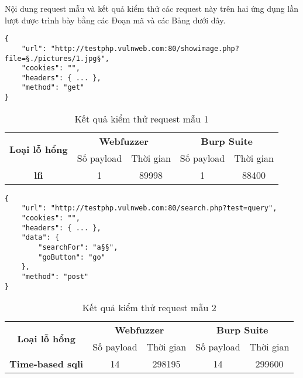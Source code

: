 \FloatBarrier
Nội dung request mẫu và kết quả kiểm thử các request này trên hai ứng dụng lần lượt được trình bày bằng các Đoạn mã và các Bảng dưới đây.
\begin{lstlisting}[style=ES6, label={lst:base-request-1}, caption={Request mẫu 1 có lỗ hổng \acrshort{lfi}}]
{
    "url": "http://testphp.vulnweb.com:80/showimage.php?file=§./pictures/1.jpg§",
    "cookies": "",
    "headers": { ... },
    "method": "get"
}
\end{lstlisting}
\FloatBarrier
\begin{table}[ht]
    \centering
    \caption{Kết quả kiểm thử request mẫu 1}
    \label{tab:testing-result-1}
    \begin{tabular}[ht]{ccccc}
        \toprule[1pt]\midrule[0.3pt]
            \multirow{2}{*}{\textbf{Loại lỗ hổng}}&\multicolumn{2}{c}{\textbf{Webfuzzer}}&\multicolumn{2}{c}{\textbf{Burp Suite}}\\
            \cmidrule(lr){2-3}\cmidrule(lr){4-5}{}&Số payload&Thời gian&Số payload&Thời gian\\
        \midrule[0.3pt]
            \textbf{\acrshort{lfi}}&1&89998&1&88400\\
        \midrule[0.3pt]\bottomrule[1pt]
    \end{tabular}
\end{table}
\FloatBarrier
\begin{lstlisting}[style=ES6, label={lst:base-request-2}, caption={Request mẫu 2 có lỗ hổng time-based \acrshort{sqli}}]
{
    "url": "http://testphp.vulnweb.com:80/search.php?test=query",
    "cookies": "",
    "headers": { ... },
    "data": {
        "searchFor": "a§§",
        "goButton": "go"
    },
    "method": "post"
}
\end{lstlisting}
\FloatBarrier
\begin{table}[ht]
    \centering
    \caption{Kết quả kiểm thử request mẫu 2}
    \label{tab:testing-result-2}
    \begin{tabular}[ht]{ccccc}
        \toprule[1pt]\midrule[0.3pt]
            \multirow{2}{*}{\textbf{Loại lỗ hổng}}&\multicolumn{2}{c}{\textbf{Webfuzzer}}&\multicolumn{2}{c}{\textbf{Burp Suite}}\\
            \cmidrule(lr){2-3}\cmidrule(lr){4-5}{}&Số payload&Thời gian&Số payload&Thời gian\\
        \midrule[0.3pt]
            \textbf{Time-based \acrshort{sqli}}&14&298195&14&299600\\
        \midrule[0.3pt]\bottomrule[1pt]
    \end{tabular}
\end{table}

